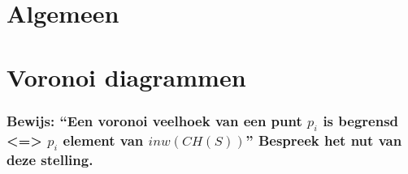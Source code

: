 \documentclass[12pt,a4paper]{article}
\begin{document}
\part{Algemeen}


\iffalse
\section{bespreek het algoritme voor het bepalen van de onderbrug en bovenbrug waarom is de kleinste y-coordinaat een slechte schatting voor het bepalen van de onderbrug?}
\section{geef een algoritme dat in O(N log N) bewerkingen nagaat of in een vz van N lijnstukken er snijdende lijnstukken in voorkomen}
\section{Bewijs correctheid van dit algoritme geef beknopt hoe dit algoritme en de gegevensstrukturen moeten aangepast worden om alle snijdingen te vinden}
\section{geef een algoritme voor de berekening van het VPP van een vz van N punten in O(nlog n) bewerkingen verantwoord de rekencomplexiteit.}
\section{bespreek graham scan + correctheidsbewijs + toon aan dat dit O(nlogn)bewerkingen gebeurt}
\section{wanneer is de inpakmethode (jarvis march) efficienter dan de methode van graham (graham scan)}
\fi

\part{Voronoi diagrammen}

\iffalse
\section{Bewijs: ``Een voronoi veelhoek van een punt $p_i$ is begrensd <=> $p_i$ element van $inw(CH(S))$'' Bespreek het nut van deze stelling.}
\end{document}
